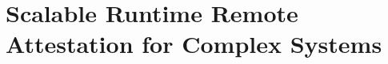 \chapter{Scalable Runtime Remote Attestation for Complex Systems} %
\label{chp:runtime-protection-untrusted} 

%



